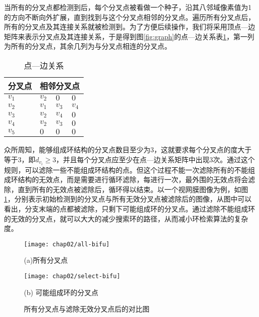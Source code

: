 当所有的分叉点都检测到后，每个分叉点被看做一个种子，沿其八邻域像素值为1的方向不断向外扩展，直到找到与这个分叉点相邻的分叉点。遍历所有分叉点后，所有的分叉点及其连接关系就被检测到。为了方便后续操作，我们将采用顶点---边矩阵来表示分叉点及其连接关系，于是得到图\ref{fig:graph}的点---边关系表\ref{tab:AdjacentStructure}，第一列为所有的分叉点，其余几列为与分叉点相连的分叉点。
\renewcommand\arraystretch{0.8}
\begin{table}[H]
\caption{点---边关系}
\centering
\begin{tabular}{p{2cm}<{\centering}p{1cm}<{\centering}p{1cm}<{\centering}p{1cm}<{\centering}}
  \hline
  分叉点 & \multicolumn{3}{c}{相邻分叉点}\\
  \hline
  \rowcolor{gray!50}
  $v_{1}$ & $v_{2}$  & $0$      & $0$  \\
  $v_{2}$ & $v_{1}$  & $v_{3}$  & $v_{4}$ \\
  \rowcolor{gray!50}
  $v_{3}$ & $v_{2}$  & $v_{4}$  & $0$\\
  $v_{4}$ & $v_{2}$  & $v_{3}$  & $0$ \\
  \rowcolor{gray!50}
  $v_{5}$ & $0$      & $0$      & $0$\\
  \hline
\end{tabular}
\label{tab:AdjacentStructure}
\end{table}

众所周知，能够组成环结构的分叉点数目至少为3，这就要求每个分叉点的度大于等于3，即$d_{v_i} \geq 3$，并且每个分叉点应至少在点---边关系矩阵中出现3次。通过这个规则，可以滤除一些不能组成环结构的点。但这个过程不能一次滤除所有的不能组成环结构的无效点，而是需要进行循环滤除，每进行一次，最外围的无效点将会滤除，直到所有的无效点被滤除后，循环得以结束。以一个视网膜图像为例，如图\ref{fig:Bifurcation}，分别表示初始检测到的分叉点与所有无效分叉点被滤除后的图像，从图中可以看出，分支末端的点都被滤除，只剩下可能组成环的分叉点。通过滤除不能组成环的无效的分叉点，就可以大大的减少搜索环的路径，从而减小环检索算法的复杂度。

\begin{figure}
\centering
  \begin{minipage}[b]{0.48\textwidth} 
      \centering 
      \texttt{[image: chap02/all-bifu]}
        \centerline{(a)所有分叉点}\medskip
	 \label{fig:3FeaturePoint}
    \end{minipage}
  \begin{minipage}[b]{0.48\textwidth}
    \centering
    \texttt{[image: chap02/select-bifu]}
      \centerline{(b) 可能组成环的分叉点}\medskip
	\label{fig:4FeaturePoint}
  \end{minipage}
\caption{所有分叉点与滤除无效分叉点后的对比图}
\label{fig:Bifurcation}
\end{figure}

